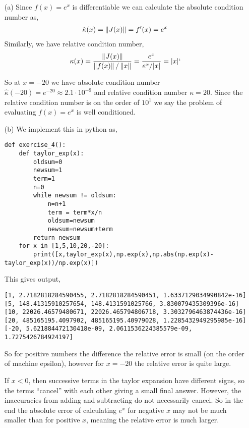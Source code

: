 \documentclass[10pt]{article}
\begin{document}
\begin{solution}[Solution]
\begin{enumerate}
    \item[(a)] Since \( f(x) = e^x \) is differentiable we can calculate the absolute condition number as,
        \begin{align*}
            \hat{\kappa}(x) = \left\lVert J(x)\right\rVert = f'(x) = e^x
        \end{align*}
        Similarly, we have relative condition number,
        \begin{align*}
            \kappa(x) = \dfrac{\left\lVert J(x)\right\rVert}{\left\lVert f(x)\right\rVert/\left\lVert x\right\rVert} = \dfrac{e^x}{e^x/|x|} = |x|`
        \end{align*}

        So at \( x=-20 \) we have absolute condition number \( \hat{\kappa}(-20) = e^{-20} \approx 2.1\cdot 10^{-9}\) and relative condition number \( \kappa = 20 \). Since the relative condition number is on the order of \( 10^1 \) we say the problem of evaluating \( f(x) = e^x \) is well conditioned.


    \item[(b)] We implement this in python as,
        \begin{lstlisting}
def exercise_4():
    def taylor_exp(x):
        oldsum=0
        newsum=1
        term=1
        n=0
        while newsum != oldsum:
            n=n+1
            term = term*x/n
            oldsum=newsum
            newsum=newsum+term
        return newsum
    for x in [1,5,10,20,-20]:
        print([x,taylor_exp(x),np.exp(x),np.abs(np.exp(x)-taylor_exp(x))/np.exp(x)])
        \end{lstlisting}

        This gives output,
        \begin{lstlisting}[basicstyle=\ttfamily\small]
[1, 2.7182818284590455, 2.7182818284590451, 1.6337129034990842e-16]
[5, 148.41315910257654, 148.4131591025766, 3.830079435309396e-16]
[10, 22026.46579480671, 22026.465794806718, 3.3032796463874436e-16]
[20, 485165195.4097902, 485165195.40979028, 1.2285432949295985e-16]
[-20, 5.621884472130418e-09, 2.0611536224385579e-09, 1.7275426784924197]
        \end{lstlisting}

        So for positive numbers the difference the relative error is small (on the order of machine epsilon), however for \( x=-20 \) the relative error is quite large.

        If \( x<0 \), then successive terms in the taylor expansion have different signs, so the terms ``cancel'' with each other giving a small final answer. However, the inaccuracies from adding and subtracting do not necessarily cancel. So in the end the absolute error of calculating \( e^x \) for negative \( x \) may not be much smaller than for positive \( x \), meaning the relative error is much larger. 



\end{enumerate}
\end{solution}
\end{document}
